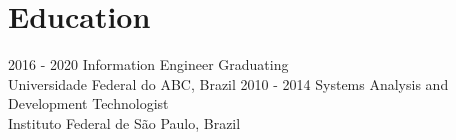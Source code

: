 \documentclass[letterpaper]{twentysecondcv} %
\begin{document}
\makeprofile %

\section{Education}

\begin{twenty} %
	\twentyitem
    	{2016 - 2020}
        {}
        {Information Engineer Graduating \textnormal{}}
        {\href{http://prograd.ufabc.edu.br/cursos/ei}\\{Universidade Federal do ABC, Brazil}}
        {}
        {}
	\twentyitem
    	{2010 - 2014}
		{}
        {Systems Analysis and Development Technologist \textnormal{}}
        {\href{https://spo.ifsp.edu.br/tads}\\{Instituto Federal de São Paulo, Brazil}}
        {}
        {}
\end{twenty}
\end{document}
